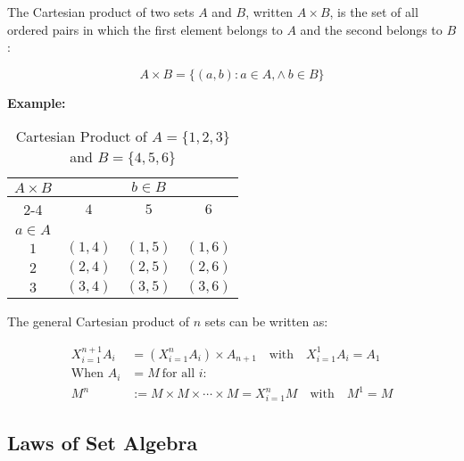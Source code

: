 The Cartesian product of two sets \(A\) and \(B\), written \(A \times B\), is the set of 
all ordered pairs in which the first element belongs to \(A\) and the second belongs to \(B\):

\[
	A \times B = \{ (a, b) : a \in A, \land\ b \in B\}
\]

\textbf{Example:}
\vspace{\baselineskip}

\begin{table}[H]
	\centering
	\caption{Cartesian Product of \(A = \{1, 2, 3\}\) and \(B = \{4, 5, 6\}\)}
	\begin{tabular}{|c|c|c|c|}
		\hline
		\multirow{3}{*}{\(A \times B\)} & \multicolumn{3}{c|}{\(b \in B\)}                       \\
		\cline{2-4}
		                              & \(4\)                            & \(5\)      & \(6\)      \\
		\hline
		\(a \in A\)                     &                                &          &          \\
		\hline
		\(1\)                           & \((1, 4)\)                       & \((1, 5)\) & \((1, 6)\) \\
		\hline
		\(2\)                           & \((2, 4)\)                       & \((2, 5)\) & \((2, 6)\) \\
		\hline
		\(3\)                           & \((3, 4)\)                       & \((3, 5)\) & \((3, 6)\) \\
		\hline
	\end{tabular}
	\label{tab:cartesian_product}
\end{table}

The general Cartesian product of \(n\) sets can be written as:

\begin{align*}
	X_{i = 1}^{n + 1} A_i & = \left( X_{i = 1}^{n} A_i \right) \times A_{n + 1} \quad \text{with} \quad X_{i = 1}^{1} A_i = A_1 \\
	\text{When } A_i      & = M \ \text{for all } i:                                                                            \\
	M^n                   & := M \times M \times \cdots \times M = X_{i = 1}^{n} M \quad \text{with} \quad M^1 = M
\end{align*}

\subsection{Laws of Set Algebra}

